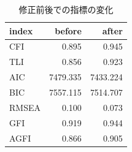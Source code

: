 \begin{table}[ht]
	\caption{修正前後での指標の変化}
	\centering
	\begin{tabular}[t]{l|rr}
		\hline
		index & before   & after    \\\hline
		CFI   & 0.895    & 0.945    \\
		TLI   & 0.856    & 0.923    \\
		AIC   & 7479.335 & 7433.224 \\
		BIC   & 7557.115 & 7514.707 \\
		RMSEA & 0.100    & 0.073    \\
		GFI   & 0.919    & 0.944    \\
		AGFI  & 0.866    & 0.905    \\
		\hline
	\end{tabular}
	\label{tab:13_03}
\end{table}
